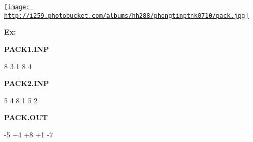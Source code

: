 



\href{http://s259.photobucket.com/albums/hh288/phongtinptnk0710/?action=view¤t=pack.jpg}{
\texttt{[image: http://i259.photobucket.com/albums/hh288/phongtinptnk0710/pack.jpg]}}

\textbf{Ex:}

\textbf{PACK1.INP}

 8 3
 1
 8
 4

\textbf{PACK2.INP}

 5
 4
 8
 1
 5
 2

\textbf{PACK.OUT}

 -5
 +4
 +8
 +1
 -7
